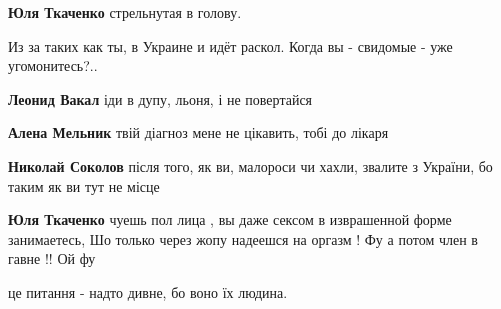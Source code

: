 \begin{itemize}
\begin{itemize}
\textbf{Юля Ткаченко} стрельнутая в голову.

 
Из за таких как ты, в Украине и идёт раскол.
Когда вы - свидомые - уже угомонитесь?..

 
\textbf{Леонид Вакал} іди в дупу, льоня, і не повертайся

 
\textbf{Алена Мельник} твій діагноз мене не цікавить, тобі до лікаря

 
\textbf{Николай Соколов} після того, як ви, малороси чи хахли, звалите з України, бо таким як ви тут не місце

 
\textbf{Юля Ткаченко} чуешь пол лица , вы даже сексом в изврашенной форме занимаетесь, Шо только через жопу надеешся на оргазм ! Фу а потом член в гавне !! Ой фу

 
це питання - надто дивне, бо воно їх людина.


\end{itemize}
\end{itemize}
